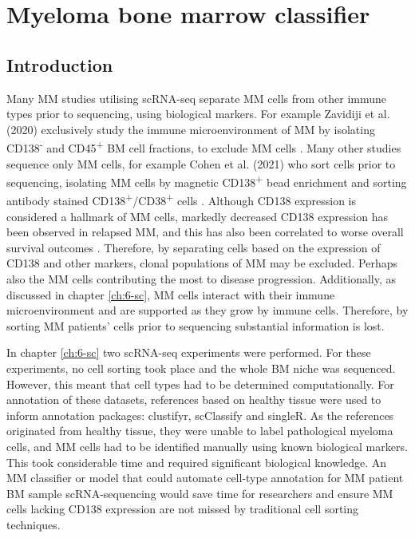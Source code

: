 \section{Myeloma bone marrow classifier}\label{sec:MM_classifier}
\subsection{Introduction}

Many MM studies utilising scRNA-seq separate MM cells from other immune types prior to sequencing, using biological markers.
For example Zavidiji et al. (2020) exclusively study the immune microenvironment of MM by isolating CD138\textsuperscript{-} and CD45\textsuperscript{+} BM cell fractions, to exclude MM cells \cite{zavidij2020single}.
Many other studies sequence only MM cells, for example Cohen et al. (2021) who sort cells prior to sequencing, isolating MM cells by magnetic CD138\textsuperscript{+} bead enrichment and sorting antibody stained CD138\textsuperscript{+}/CD38\textsuperscript{+} cells \cite{cohen2021identification}.
Although CD138 expression is considered a hallmark of MM cells, markedly decreased CD138 expression has been observed in relapsed MM, and this has also been correlated to worse overall survival outcomes \cite{kawano2012multiple}.
Therefore, by separating cells based on the expression of CD138 and other markers, clonal populations of MM may be excluded.
Perhaps also the MM cells contributing the most to disease progression.
Additionally, as discussed in chapter \ref{ch:6-sc}, MM cells interact with their immune microenvironment and are supported as they grow by immune cells.
Therefore, by sorting MM patients' cells prior to sequencing substantial information is lost.

In chapter \ref{ch:6-sc} two scRNA-seq experiments were performed.
For these experiments, no cell sorting took place and the whole BM niche was sequenced.
However, this meant that cell types had to be determined computationally.
For annotation of these datasets, references based on healthy tissue were used to inform annotation packages: clustifyr, scClassify and singleR.
As the references originated from healthy tissue, they were unable to label pathological myeloma cells, and MM cells had to be identified manually using known biological markers.
This took considerable time and required significant biological knowledge.
An MM classifier or model that could automate cell-type annotation for MM patient BM sample scRNA-sequencing would save time for researchers and ensure MM cells lacking CD138 expression are not missed by traditional cell sorting techniques.

